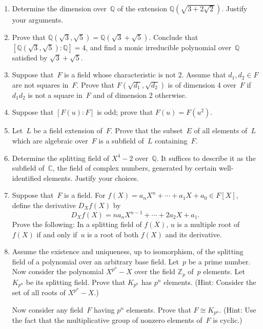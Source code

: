\documentclass[11pt,letterpaper]{article}
\newenvironment{examproblems}[2]{%
  \def\ProblemHeadingTag{#2}%
  \AssignTaggingSocketPlug{block/list/label}{examproblem}%
  \begin{enumerate}%
  \setcounter{enumi}{#1}%
  \renewcommand{\labelenumi}{\textbf{\theenumi.}}%
  \setlength{\topsep}{0.35em}%
  \setlength{\partopsep}{0pt}%
  \setlength{\itemsep}{0.48em}%
  \setlength{\parsep}{0.18em}%
}{\end{enumerate}}
\begin{document}
\begin{examproblems}{0}{H2}
\[
[L:F]=[L:K][K:F].
\]
\def\ProblemHeadingText{Problem 106.}
\item
Determine the dimension over~\(\mathbb{Q}\) of the extension \(\mathbb{Q}(\sqrt{3+2\sqrt{2}})\). Justify your arguments.
\def\ProblemHeadingText{Problem 107.}
\item
Prove that \(\mathbb{Q}(\sqrt{3},\sqrt{5})=\mathbb{Q}(\sqrt{3}+\sqrt{5})\). Conclude that \([\mathbb{Q}(\sqrt{3},\sqrt{5}):\mathbb{Q}]=4\), and find a monic irreducible polynomial over~\(\mathbb{Q}\) satisfied by \(\sqrt{3}+\sqrt{5}\).
\def\ProblemHeadingText{Problem 108.}
\item
Suppose that~\(F\) is a field whose characteristic is not 2. Assume that \(d_1,d_2\in F\) are not squares in~\(F\). Prove that \(F(\sqrt{d_1},\sqrt{d_2})\) is of dimension 4 over~\(F\) if \(d_1d_2\) is not a square in~\(F\) and of dimension 2 otherwise.
\def\ProblemHeadingText{Problem 109.}
\item
Suppose that \([F(u):F]\) is odd; prove that \(F(u)=F(u^2)\).
\def\ProblemHeadingText{Problem 110.}
\item
Let~\(L\) be a field extension of~\(F\). Prove that the subset~\(E\) of all elements of~\(L\) which are algebraic over~\(F\) is a subfield of~\(L\) containing~\(F\).
\def\ProblemHeadingText{Problem 111.}
\item
Determine the splitting field of \(X^4-2\) over~\(\mathbb{Q}\). It suffices to describe it as the subfield of~\(\mathbb{C}\), the field of complex numbers, generated by certain well-identified elements. Justify your choices.
\def\ProblemHeadingText{Problem 112.}
\item
Suppose that~\(F\) is a field. For \(f(X)=a_nX^n+\cdots+a_1X+a_0\in F[X]\), define the derivative \(D_Xf(X)\) by
\[
D_Xf(X)=na_nX^{n-1}+\cdots+2a_2X+a_1.
\]
 Prove the following: In a splitting field of \(f(X)\), \(u\) is a multiple root of \(f(X)\) if and only if~\(u\) is a root of both \(f(X)\) and its derivative.
\def\ProblemHeadingText{Problem 113.}
\item
Assume the existence and uniqueness, up to isomorphism, of the splitting field of a polynomial over an arbitrary base field. Let~\(p\) be a prime number. Now consider the polynomial \(X^{p^n}-X\) over the field \(\mathbb{Z}_p\) of~\(p\) elements. Let \(K_{p^n}\) be its splitting field. Prove that \(K_{p^n}\) has \(p^n\) elements. (Hint: Consider the set of all roots of \(X^{p^n}-X\).)

\par
Now consider any field~\(F\) having \(p^n\) elements. Prove that \(F\cong K_{p^n}\). (Hint: Use the fact that the multiplicative group of nonzero elements of~\(F\) is cyclic.)
\end{examproblems}
\end{document}
